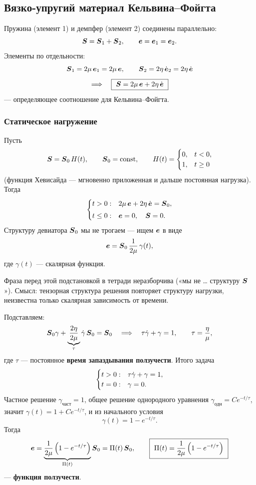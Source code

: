 \subsection{Вязко-упругий материал Кельвина–Фойгта}


Пружина (элемент 1) и демпфер (элемент 2) соединены параллельно:
\[
  \boldsymbol{S} = \boldsymbol{S}_1 + \boldsymbol{S}_2 ,
  \qquad
  \boldsymbol{e} = \boldsymbol{e}_1 = \boldsymbol{e}_2 .
\]
Элементы по отдельности:
\[
  \boldsymbol{S}_1 = 2\mu\,\boldsymbol{e}_1 = 2\mu\,\boldsymbol{e} ,
  \qquad
  \boldsymbol{S}_2 = 2\eta\,\dot{\boldsymbol{e}}_2 = 2\eta\,\dot{\boldsymbol{e}}
\]
\[
  \Longrightarrow\quad
  \boxed{\ \boldsymbol{S} = 2\mu\,\boldsymbol{e} + 2\eta\,\dot{\boldsymbol{e}}\ }
\]
— определяющее соотношение для Кельвина–Фойгта.

\subsubsection*{Статическое нагружение}

Пусть
\[
  \boldsymbol{S} = \boldsymbol{S}_0\, H(t), \qquad \boldsymbol{S}_0 = \mathrm{const} ,
  \qquad
  H(t) = \begin{cases} 0, & t < 0, \\ 1, & t \ge 0 \end{cases}
\]
(функция Хевисайда — мгновенно приложенная и дальше постоянная нагрузка). Тогда
\[
  \begin{cases}
    t > 0: & 2\mu\,\boldsymbol{e} + 2\eta\,\dot{\boldsymbol{e}} = \boldsymbol{S}_0 , \\[0.3em]
    t \le 0: & \boldsymbol{e} = 0, \quad \boldsymbol{S} = 0 .
  \end{cases}
\]
Структуру девиатора $\boldsymbol{S}_0$ мы не трогаем — ищем $\boldsymbol{e}$ в виде
\[
  \boldsymbol{e} = \boldsymbol{S}_0 \,\frac{1}{2\mu}\, \gamma(t) ,
\]
где $\gamma(t)$ — скалярная функция.

\begin{warn}
Фраза перед этой подстановкой в тетради неразборчива («мы не \dots{} структуру
$\boldsymbol{S}$»). Смысл: тензорная структура решения повторяет структуру нагрузки,
неизвестна только скалярная зависимость от времени.
\end{warn}

Подставляем:
\[
  \boldsymbol{S}_0\gamma + \underbrace{\frac{2\eta}{2\mu}}_{\tau}\dot{\gamma}\,\boldsymbol{S}_0 = \boldsymbol{S}_0
  \quad\Longrightarrow\quad
  \tau\dot{\gamma} + \gamma = 1 ,
  \qquad
  \tau = \frac{\eta}{\mu} ,
\]
где $\tau$ — постоянное \textbf{время запаздывания ползучести}. Итого задача
\[
  \begin{cases}
    t > 0: & \tau\dot{\gamma} + \gamma = 1 , \\
    t = 0: & \gamma = 0 .
  \end{cases}
\]
Частное решение $\gamma_{\text{част}} = 1$, общее решение однородного уравнения
$\gamma_{\text{одн}} = C e^{-t/\tau}$, значит $\gamma(t) = 1 + Ce^{-t/\tau}$, и из
начального условия
\[
  \gamma(t) = 1 - e^{-t/\tau} .
\]
Тогда
\[
  \dev = \underbrace{\frac{1}{2\mu}\left(1 - e^{-t/\tau}\right)}_{\Pi(t)}\Sdev_0
  = \Pi(t)\,\Sdev_0 ,
  \qquad
  \boxed{\ \Pi(t) = \frac{1}{2\mu}\left(1 - e^{-t/\tau}\right)\ }
\]
— \textbf{функция ползучести}.


